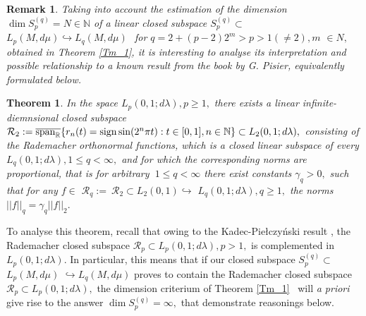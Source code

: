 \documentclass[pdflatex,sn-mathphys-num]{sn-jnl}%
\theoremstyle{thmstyleone}%
\newtheorem{theorem}{Theorem}%
\theoremstyle{thmstyletwo}%
\newtheorem{remark}{Remark}%
\theoremstyle{thmstylethree}%
\begin{document}
\begin{remark}
	Taking into account the estimation of the dimension $\dim S_{p}^{(q)}=N\in 
	\mathbb{N}$ of a linear closed subspace $S_{p}^{(q)}\subset $ $L_{p}(M,d\mu
	)\hookrightarrow L_{q}(M,d\mu )\ $\ for $q=2+(p-2)2^{m}>p>1(\neq 2),m$ $\in
	N,$ obtained in Theorem \ref{Tm_1}, it is interesting to analyse its
	interpretation and possible relationship to a known result from the book 
	\cite{Pisi} by G. Pisier, equivalently formulated below. \ 
\end{remark}

\begin{theorem}
	\label{Tm_1.1}In the space $L_{p}(0,1;d\lambda ),p\geq 1,$ there exists a
	linear infinite-diemnsional closed subspace $\mathcal{R}_{2}:=\overline{%
		\mathrm{span}_{\mathbb{R}}}\{r_{n}(t)=\mathrm{sign\sin }(2^{n}\pi t):t\in
	\lbrack 0,1],n\in \mathbb{N}\}\subset L_{2}(0,1;d\lambda ),$ consisting of
	the Rademacher orthonormal functions, which is a closed linear subspace of
	every $L_{q}(0,1;d\lambda ),1\leq q<\infty ,$ and for which the
	corresponding norms are proportional, that is for arbitrary $\ 1\leq
	q<\infty $ there exist constants $\gamma _{q}>0,$ such that for any $f\in $ $%
	\mathcal{R}_{q}:=\ \mathcal{R}_{2}\subset L_{2}(0,1)\hookrightarrow $ $%
	L_{q}(0,1;d\lambda ),q\geq 1,$ the norms $||f||_{q}=\gamma _{q}||f||_{2}.$
\end{theorem}

To analyse this theorem, recall that owing to the Kadec-Pie\l czy\'{n}ski
result  \cite{KaPe}, the Rademacher closed subspace $\mathcal{R}%
_{p}\subset L_{p}(0,1;d\lambda ),p>1,$ is complemented in $%
L_{p}(0,1;d\lambda ).$ In particular, this means that if our closed subspace 
$S_{p}^{(q)}\subset $ $L_{p}(M,d\mu )$ $\hookrightarrow L_{q}(M,d\mu )$
proves to contain the Rademacher closed subspace $\mathcal{R}_{p}\subset
L_{p}(0,1;d\lambda ),$ the dimension criterium of Theorem \ref{Tm_1} \
will \textit{a priori} give rise to the answer $\dim S_{p}^{(q)}=\infty ,$
that demonstrate reasonings below.
\end{document}
